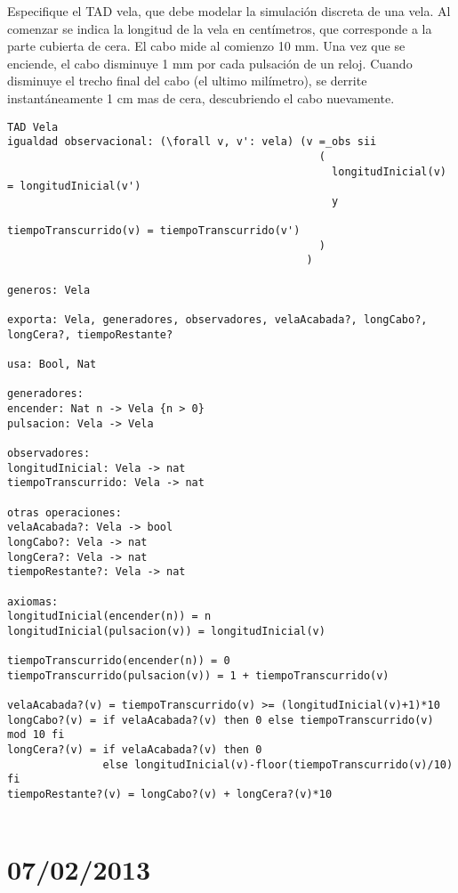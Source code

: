 \documentclass[10pt, a4paper]{article}
\begin{document}
Especifique el TAD vela, que debe modelar la simulaci\'on discreta de una vela. Al comenzar se indica la longitud de la vela en cent\'imetros, que corresponde a la parte cubierta de cera. El cabo mide al comienzo 10 mm. Una vez que se enciende, el cabo disminuye 1 mm por cada pulsaci\'on de un reloj. Cuando disminuye el trecho final del cabo (el ultimo mil\'imetro), se derrite instant\'aneamente 1 cm mas de cera, descubriendo el cabo nuevamente.

\newpage
\begin{verbatim}
TAD Vela
igualdad observacional: (\forall v, v': vela) (v =_obs sii 
                                                 ( 
                                                   longitudInicial(v) = longitudInicial(v') 
                                                   y 
                                                   tiempoTranscurrido(v) = tiempoTranscurrido(v')
                                                 )
                                               )

generos: Vela

exporta: Vela, generadores, observadores, velaAcabada?, longCabo?, longCera?, tiempoRestante?

usa: Bool, Nat

generadores:
encender: Nat n -> Vela {n > 0}
pulsacion: Vela -> Vela

observadores:
longitudInicial: Vela -> nat
tiempoTranscurrido: Vela -> nat

otras operaciones:
velaAcabada?: Vela -> bool
longCabo?: Vela -> nat
longCera?: Vela -> nat
tiempoRestante?: Vela -> nat

axiomas:
longitudInicial(encender(n)) = n
longitudInicial(pulsacion(v)) = longitudInicial(v)

tiempoTranscurrido(encender(n)) = 0
tiempoTranscurrido(pulsacion(v)) = 1 + tiempoTranscurrido(v)

velaAcabada?(v) = tiempoTranscurrido(v) >= (longitudInicial(v)+1)*10
longCabo?(v) = if velaAcabada?(v) then 0 else tiempoTranscurrido(v) mod 10 fi
longCera?(v) = if velaAcabada?(v) then 0 
               else longitudInicial(v)-floor(tiempoTranscurrido(v)/10) fi
tiempoRestante?(v) = longCabo?(v) + longCera?(v)*10


\end{verbatim}

\newpage
\section{07/02/2013}
\end{document}
